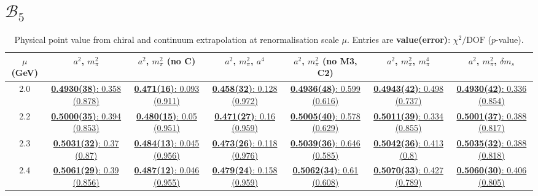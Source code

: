 \documentclass[12pt]{extarticle}
\begin{document}
\section{$\mathcal{B}_5$}
\begin{table}[h!]
\begin{center}
\begin{tabular}{|c|c|c|c|c|c|c|}
\hline
$\mu$ (GeV) & $a^2$, $m_\pi^2$& $a^2$, $m_\pi^2$ (no C)& $a^2$, $m_\pi^2$, $a^4$& $a^2$, $m_\pi^2$ (no M3, C2)& $a^2$, $m_\pi^2$, $m_\pi^4$& $a^2$, $m_\pi^2$, $\delta m_s$\\
\hline
2.0& \hyperlink{TT/SUSY/bag_a2m2_20.pdf.1}{\textbf{0.4930(38)}: 0.358 (0.878)} & \hyperlink{TT/SUSY/bag_a2m2noC_20.pdf.1}{\textbf{0.471(16)}: 0.093 (0.911)} & \hyperlink{TT/SUSY/bag_a2a4m2_20.pdf.1}{\textbf{0.458(32)}: 0.128 (0.972)} & \hyperlink{TT/SUSY/bag_a2m2mcut_20.pdf.1}{\textbf{0.4936(48)}: 0.599 (0.616)} & \hyperlink{TT/SUSY/bag_a2m2m4_20.pdf.1}{\textbf{0.4943(42)}: 0.498 (0.737)} & \hyperlink{TT/SUSY/bag_a2m2delm_20.pdf.1}{\textbf{0.4930(42)}: 0.336 (0.854)}\\
2.2& \hyperlink{TT/SUSY/bag_a2m2_22.pdf.1}{\textbf{0.5000(35)}: 0.394 (0.853)} & \hyperlink{TT/SUSY/bag_a2m2noC_22.pdf.1}{\textbf{0.480(15)}: 0.05 (0.951)} & \hyperlink{TT/SUSY/bag_a2a4m2_22.pdf.1}{\textbf{0.471(27)}: 0.16 (0.959)} & \hyperlink{TT/SUSY/bag_a2m2mcut_22.pdf.1}{\textbf{0.5005(40)}: 0.578 (0.629)} & \hyperlink{TT/SUSY/bag_a2m2m4_22.pdf.1}{\textbf{0.5011(39)}: 0.334 (0.855)} & \hyperlink{TT/SUSY/bag_a2m2delm_22.pdf.1}{\textbf{0.5001(37)}: 0.388 (0.817)}\\
2.3& \hyperlink{TT/SUSY/bag_a2m2_23.pdf.1}{\textbf{0.5031(32)}: 0.37 (0.87)} & \hyperlink{TT/SUSY/bag_a2m2noC_23.pdf.1}{\textbf{0.484(13)}: 0.045 (0.956)} & \hyperlink{TT/SUSY/bag_a2a4m2_23.pdf.1}{\textbf{0.473(26)}: 0.118 (0.976)} & \hyperlink{TT/SUSY/bag_a2m2mcut_23.pdf.1}{\textbf{0.5039(36)}: 0.646 (0.585)} & \hyperlink{TT/SUSY/bag_a2m2m4_23.pdf.1}{\textbf{0.5042(36)}: 0.413 (0.8)} & \hyperlink{TT/SUSY/bag_a2m2delm_23.pdf.1}{\textbf{0.5035(32)}: 0.388 (0.818)}\\
2.4& \hyperlink{TT/SUSY/bag_a2m2_24.pdf.1}{\textbf{0.5061(29)}: 0.39 (0.856)} & \hyperlink{TT/SUSY/bag_a2m2noC_24.pdf.1}{\textbf{0.487(12)}: 0.046 (0.955)} & \hyperlink{TT/SUSY/bag_a2a4m2_24.pdf.1}{\textbf{0.479(24)}: 0.158 (0.959)} & \hyperlink{TT/SUSY/bag_a2m2mcut_24.pdf.1}{\textbf{0.5062(34)}: 0.61 (0.608)} & \hyperlink{TT/SUSY/bag_a2m2m4_24.pdf.1}{\textbf{0.5070(33)}: 0.427 (0.789)} & \hyperlink{TT/SUSY/bag_a2m2delm_24.pdf.1}{\textbf{0.5060(30)}: 0.406 (0.805)}\\
\hline
\end{tabular}
\caption{Physical point value from chiral and continuum extrapolation at renormalisation scale $\mu$. Entries are \textbf{value(error)}: $\chi^2/\text{DOF}$ ($p$-value).}
\end{center}
\end{table}
\end{document}
